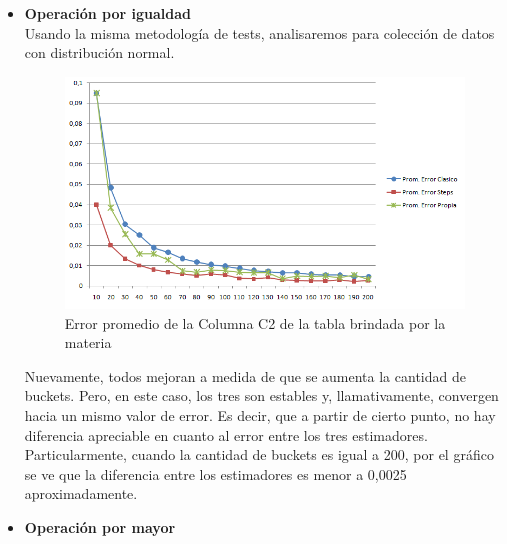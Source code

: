 \begin{itemize}
\item \textbf{Operaci\'on por igualdad} \\

\quad Usando la misma metodolog\'ia de tests, analisaremos para colecci\'on de datos con distribuci\'on normal. \\

\begin{figure}[H]
	  \begin{center}
	    \includegraphics[scale=.80]{imagenes/parametroVariableC2Eq.png}
	    \caption{Error promedio de la Columna C2 de la tabla brindada por la materia} 
	    \label{fig:C2_variando_paremetro}
	  \end{center}
\end{figure}

\quad Nuevamente, todos mejoran a medida de que se aumenta la cantidad de buckets. Pero, en este caso, los tres son estables y, llamativamente, convergen hacia un mismo valor de error. Es decir, que a partir de cierto punto, no hay diferencia apreciable en cuanto al error entre los tres estimadores. Particularmente, cuando la cantidad de buckets es igual a 200, por el gr\'afico se ve que la diferencia entre los estimadores es menor a 0,0025 aproximadamente.\\

\item \textbf{Operaci\'on por mayor} \\


\end{itemize}

